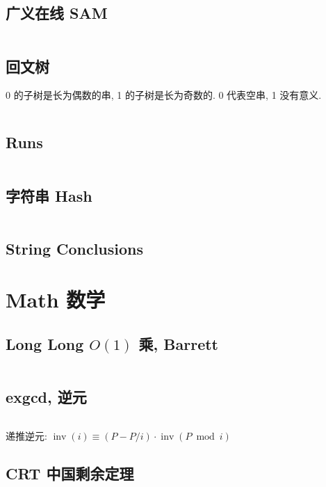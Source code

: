 \documentclass[titlepage, a4paper, 11pt]{article}
\begin{document}
\begin{spacing}{1.15}
				\subsection{广义在线 SAM}
				\inputminted{cpp}{src/String/generalizedSAM.cpp}
				\subsection{回文树}
					0 的子树是长为偶数的串, 1 的子树是长为奇数的. 0 代表空串, 1 没有意义.
					\inputminted{cpp}{src/String/PAM.cpp}
				\subsection{Runs}
					\inputminted{cpp}{src/String/Runs.cpp}
				\subsection{字符串 Hash}
				\inputminted{cpp}{src/String/hash.cpp}	
				\subsection{String Conclusions}
					
			\newpage
			\section{Math 数学}
				\subsection{Long Long $O(1)$ 乘, Barrett}
					\inputminted{cpp}{src/Miscellany/LLFPM.cpp}
				\subsection{exgcd, 逆元}
					
					\inputminted{cpp}{src/Math/exgcd.cpp}
					递推逆元: $\operatorname{inv}(i) \equiv (P - P / i) \cdot \operatorname{inv}(P \bmod i)$
				\subsection{CRT 中国剩余定理}
					\inputminted{cpp}{src/Math/CRT_lbn.cpp}

\end{spacing}
\end{document}
